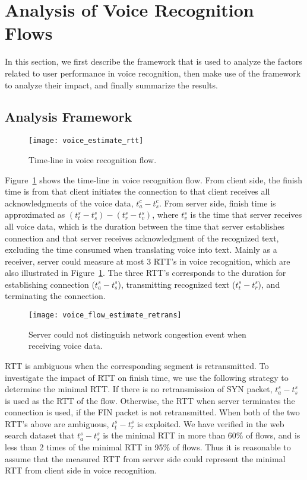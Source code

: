 
\section{Analysis of Voice Recognition Flows}

In this section, we first describe the framework that is used to analyze the factors related to user performance in voice recognition, then make use of the framework to analyze their impact, and finally summarize the results.

\subsection{Analysis Framework}

\begin{figure}[th]
\centering
	\texttt{[image: voice\_estimate\_rtt]}
\caption{Time-line in voice recognition flow.}
\label{fig:voice_estimate_rtt}
\end{figure}

Figure~\ref{fig:voice_estimate_rtt} shows the time-line in voice recognition flow. From client side, the finish time is from that client initiates the connection to that client receives all acknowledgments of the voice data, \ie $t^c_a - t^c_s$. From server side, finish time is approximated as $(t^s_t - t^s_s) - (t^s_r - t^s_v)$, where $t^s_v$ is the time that server receives all voice data, which is the duration between the time that server establishes connection and that server receives acknowledgment of the recognized text, excluding the time consumed when translating voice into text. Mainly as a receiver, server could measure at most 3 RTT's in voice recognition, which are also illustrated in Figure~\ref{fig:voice_estimate_rtt}. The three RTT's corresponds to the duration for establishing connection ($t^s_a - t^s_s$), transmitting recognized text ($t^s_t - t^s_r$), and terminating the connection.

\begin{figure*}[th]
\centering
	\texttt{[image: voice\_flow\_estimate\_retrans]}
\caption{Server could not distinguish network congestion event when receiving voice data.}
\label{fig:voice_flow_estimate_retrans}
\end{figure*}

RTT is ambiguous when the corresponding segment is retransmitted. To investigate the impact of RTT on finish time, we use the following strategy to determine the minimal RTT. If there is no retransmission of SYN packet, $t^s_a - t^s_s$ is used as the RTT of the flow. Otherwise, the RTT when server terminates the connection is used, if the FIN packet is not retransmitted. When both of the two RTT's above are ambiguous, $t^s_t - t^s_r$ is exploited. We have verified in the web search dataset that $t^s_a - t^s_s$ is the minimal RTT in more than 60\% of flows, and is less than 2 times of the minimal RTT in 95\% of flows. Thus it is reasonable to assume that the measured RTT from server side could represent the minimal RTT from client side in voice recognition.

